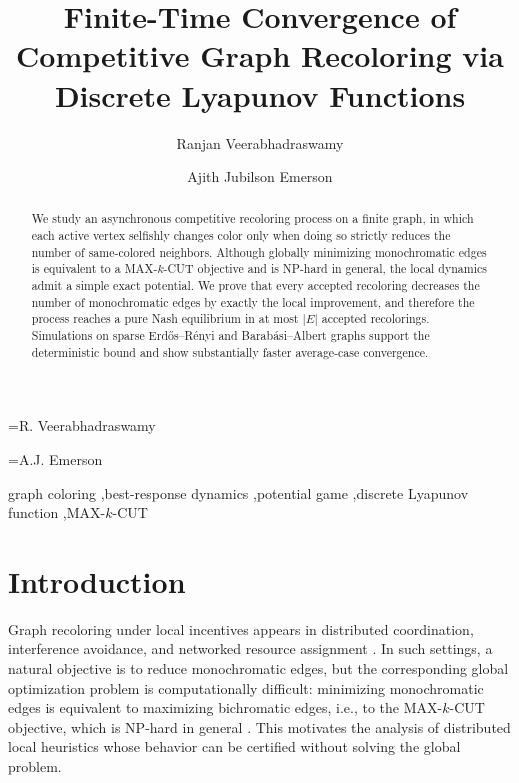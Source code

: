 \documentclass[preprint,12pt]{elsarticle}
\makeatletter
\newcommand{\eadauthorname}[1]{\@eadauthor={#1}}
\makeatother
\begin{document}
\begin{frontmatter}

\title{Finite-Time Convergence of Competitive Graph Recoloring via Discrete Lyapunov Functions}

\author[vitap]{Ranjan Veerabhadraswamy}
\eadauthorname{R. Veerabhadraswamy}

\author[vitap]{Ajith Jubilson Emerson}
\eadauthorname{A.J. Emerson}


\begin{abstract}
We study an asynchronous competitive recoloring process on a finite graph, in
which each active vertex selfishly changes color only when doing so strictly
reduces the number of same-colored neighbors. Although globally minimizing
monochromatic edges is equivalent to a MAX-$k$-CUT objective and is NP-hard in
general, the local dynamics admit a simple exact potential. We prove that every
accepted recoloring decreases the number of monochromatic edges by exactly the
local improvement, and therefore the process reaches a pure Nash equilibrium in
at most $|E|$ accepted recolorings. Simulations on sparse Erd\H{o}s--R\'enyi and
Barab\'asi--Albert graphs support the deterministic bound and show substantially
faster average-case convergence.
\end{abstract}

\begin{keyword}
graph coloring \sep best-response dynamics \sep potential game \sep discrete
Lyapunov function \sep MAX-$k$-CUT
\end{keyword}

\end{frontmatter}

\section{Introduction}

Graph recoloring under local incentives appears in distributed coordination,
interference avoidance, and networked resource assignment
\cite{kuhn2006,panagopoulou2008}. In such settings, a natural objective is to
reduce monochromatic edges, but the corresponding global optimization problem
is computationally difficult: minimizing monochromatic edges is equivalent to
maximizing bichromatic edges, i.e., to the MAX-$k$-CUT objective, which is
NP-hard in general \cite{garey1979,frieze1997}. This motivates the analysis of
distributed local heuristics whose behavior can be certified without solving
the global problem.
\end{document}
